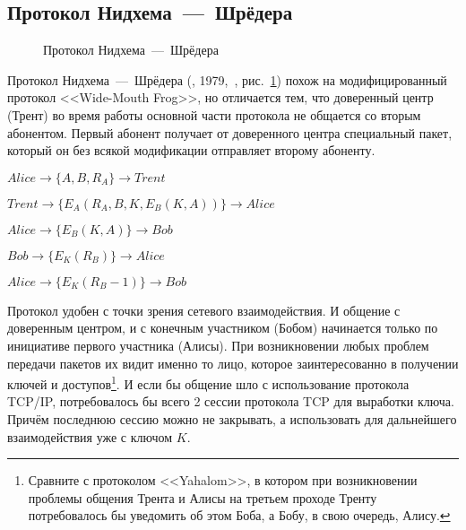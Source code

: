 \subsection{Протокол Нидхема~---~Шрёдера}\label{section-protocols-needham-schroeder}

\begin{figure}
	\centering
	\begin{sequencediagram}
		
	\end{sequencediagram}
	\caption{Протокол Нидхема~---~Шрёдера\label{fig:key_distribution-needham-schroeder}}
\end{figure}

Протокол Нидхема~---~Шрёдера (, 1979,~\cite{Needham:Schroeder:1978}, рис.~\ref{fig:key_distribution-needham-schroeder}) похож на модифицированный протокол <<Wide-Mouth Frog>>, но отличается тем, что доверенный центр (Трент) во время работы основной части протокола не общается со вторым абонентом. Первый абонент получает от доверенного центра специальный пакет, который он без всякой модификации отправляет второму абоненту.

\begin{protocol}
	\item[(1)] $ Alice	\to \{ A, B, R_A \}						\to Trent $
	\item[(2)] $ Trent	\to \{ E_A \left( R_A, B, K, E_B \left( K, A \right) \right) \}	\to Alice $
	\item[(3)] $ Alice	\to \{ E_B \left( K, A \right) \}				\to Bob $
	\item[(4)] $ Bob	\to \{ E_K \left( R_B \right) \}				\to Alice $
	\item[(5)] $ Alice	\to \{ E_K \left( R_B - 1 \right) \}				\to Bob $
\end{protocol}

Протокол удобен с точки зрения сетевого взаимодействия. И общение с доверенным центром, и с конечным участником (Бобом) начинается только по инициативе первого участника (Алисы). При возникновении любых проблем передачи пакетов их видит именно то лицо, которое заинтересованно в получении ключей и доступов\footnote{Сравните с протоколом <<Yahalom>>, в котором при возникновении проблемы общения Трента и Алисы на третьем проходе Тренту потребовалось бы уведомить об этом Боба, а Бобу, в свою очередь, Алису.}. И если бы общение шло с использование протокола TCP/IP, потребовалось бы всего 2 сессии протокола TCP для выработки ключа. Причём последнюю сессию можно не закрывать, а использовать для дальнейшего взаимодействия уже с ключом $K$.

